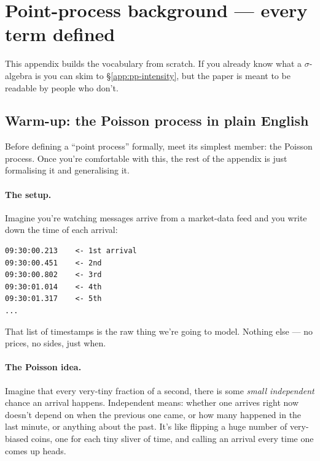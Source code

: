 
\section{Point-process background --- every term defined}
\label{app:pp-background}

This appendix builds the vocabulary from scratch. If you already know what a $\sigma$-algebra is you can skim to \S\ref{app:pp-intensity}, but the paper is meant to be readable by people who don't.

\subsection*{Warm-up: the Poisson process in plain English}
\label{app:pp-warmup}

Before defining a ``point process'' formally, meet its simplest member: the Poisson process. Once you're comfortable with this, the rest of the appendix is just formalising it and generalising it.

\paragraph{The setup.} Imagine you're watching messages arrive from a market-data feed and you write down the time of each arrival:

\begin{verbatim}
09:30:00.213    <- 1st arrival
09:30:00.451    <- 2nd
09:30:00.802    <- 3rd
09:30:01.014    <- 4th
09:30:01.317    <- 5th
...
\end{verbatim}

That list of timestamps is the raw thing we're going to model. Nothing else --- no prices, no sides, just when.

\paragraph{The Poisson idea.} Imagine that every very-tiny fraction of a second, there is some \emph{small independent} chance an arrival happens. Independent means: whether one arrives right now doesn't depend on when the previous one came, or how many happened in the last minute, or anything about the past. It's like flipping a huge number of very-biased coins, one for each tiny sliver of time, and calling an arrival every time one comes up heads.

